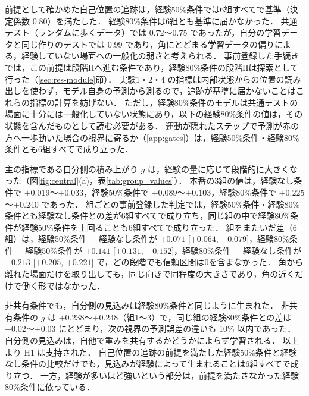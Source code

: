 前提として確かめた自己位置の追跡は，経験50\%条件では6組すべてで基準（決定係数 0.80）を満たした．
経験80\%条件は6組とも基準に届かなかった．
共通テスト（ランダムに歩くデータ）では 0.72〜0.75 であったが，自分の学習データと同じ作りのテストでは 0.99 であり，角にとどまる学習データの偏りによる，経験していない場面への一般化の弱さと考えられる．
事前登録した手続きでは，この前提は段階IIへ進む条件であり，経験80\%条件の段階IIは探索として行った（\ref{sec:res-module}節）．
実験1・2・4 の指標は内部状態からの位置の読み出しを使わず，モデル自身の予測から測るので，追跡が基準に届かないことはこれらの指標の計算を妨げない．
ただし，経験80\%条件のモデルは共通テストの場面に十分には一般化していない状態にあり，以下の経験80\%条件の値は，その状態を含んだものとして読む必要がある．
運動が隠れたステップで予測が赤の方へ一歩動いた場合の視界に寄るか（\ref{app:gates}）は，経験50\%条件・経験80\%条件とも6組すべてで成り立った．

主の指標である自分側の積み上がり $g$ は，経験の量に応じて段階的に大きくなった（図\ref{fig:central}(a)，表\ref{tab:group_values}）．
本番の3組の値は，経験なし条件で $+0.019$〜$+0.033$，経験50\%条件で $+0.089$〜$+0.103$，経験80\%条件で $+0.225$〜$+0.240$ であった．
組ごとの事前登録した判定では，経験50\%条件・経験80\%条件とも経験なし条件との差が6組すべてで成り立ち，同じ組の中で経験80\%条件が経験50\%条件を上回ることも6組すべてで成り立った．
組をまたいだ差（6組）は，経験50\%条件 $-$ 経験なし条件が $+0.071$ [$+0.064$, $+0.079$]，経験80\%条件 $-$ 経験50\%条件が $+0.141$ [$+0.131$, $+0.152$]，経験80\%条件 $-$ 経験なし条件が $+0.213$ [$+0.205$, $+0.221$] で，どの段階でも信頼区間は0を含まなかった．
角から離れた場面だけを取り出しても，同じ向きで同程度の大きさであり，角の近くだけで働く形ではなかった．

非共有条件でも，自分側の見込みは経験80\%条件と同じように生まれた．
非共有条件の $g$ は $+0.238$〜$+0.248$（組1〜3）で，同じ組の経験80\%条件との差は $-0.02$〜$+0.03$ にとどまり，次の視界の予測誤差の違いも 10\% 以内であった．
自分側の見込みは，自他で重みを共有するかどうかによらず学習される．
以上より H1 は支持された．
自己位置の追跡の前提を満たした経験50\%条件と経験なし条件の比較だけでも，見込みが経験によって生まれることは6組すべてで成り立つ．
一方，経験が多いほど強いという部分は，前提を満たさなかった経験80\%条件に依っている．

